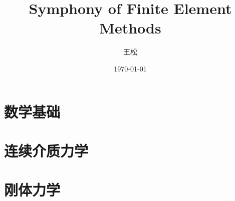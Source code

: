 \documentclass[lang=cn,newtx,10pt,scheme=chinese]{elegantbook}
\title{Symphony of Finite Element Methods}
\author{王松}
\date{\today}
\begin{document}
\maketitle
\frontmatter

\tableofcontents

\mainmatter

\part{数学基础}

\part{连续介质力学}

\part{刚体力学}

\end{document}
